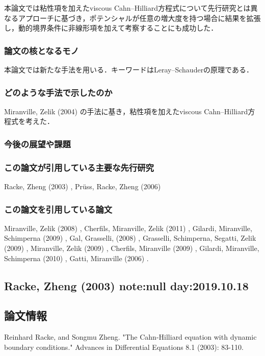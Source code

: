 \documentclass[a4paper]{article}
\begin{document}
		本論文では粘性項を加えたviscous Cahn--Hilliard方程式について先行研究とは異なるアプローチに基づき，ポテンシャルが任意の増大度を持つ場合に結果を拡張し，動的境界条件に非線形項を加えて考察することにも成功した．
	\subsubsection{論文の核となるモノ}
		本論文では新たな手法を用いる．キーワードはLeray--Schauderの原理である．
	\subsubsection{どのような手法で示したのか}
		Miranville, Zelik (2004) \cite{MiranvilleZelik2004} の手法に基き，粘性項を加えたviscous Cahn--Hilliard方程式を考えた．
	\subsubsection{今後の展望や課題}
	\subsubsection{この論文が引用している主要な先行研究}
		Racke, Zheng (2003) \cite{RackeZheng2003}, Pr\"uss, Racke, Zheng (2006) \cite{PrussRackeZheng2006} 
	\subsubsection{この論文を引用している論文}
		Miranville, Zelik (2008) \cite{MiranvilleZelik2008},
		Cherfils, Miranville, Zelik (2011) \cite{CherfilsMiranvilleZelik2011},
		Gilardi, Miranville, Schimperna (2009) \cite{GilardiMiranvilleSchimperna2009},
		Gal, Grasselli, (2008) \cite{GalGrasselli2008},
		Grasselli, Schimperna, Segatti, Zelik (2009) \cite{GrasselliSchimpernaSegattiZelik2009},
		Miranville, Zelik (2009) \cite{MiranvilleZelik2009},
		Cherfils, Miranville (2009) \cite{CherfilsMiranville2009},
		Gilardi, Miranville, Schimperna (2010) \cite{GilardiMiranvilleSchimperna2010},
		Gatti, Miranville (2006) \cite{GattiMiranville2006}.

\newpage

\subsection{Racke, Zheng (2003) \cite{RackeZheng2003} note:null day:2019.10.18}
	\subsection{論文情報}
		Reinhard Racke, and Songmu Zheng. "The Cahn-Hilliard equation with dynamic boundary conditions." Advances in Differential Equations 8.1 (2003): 83-110.
\end{document}
